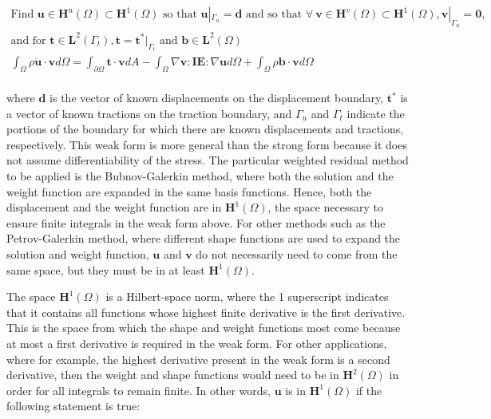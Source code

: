 \documentclass[10pt]{article}
\begin{document}
\begin{tcolorbox}
\begin{equation}
\label{eq:WeakFormQ1}
\begin{aligned}
\text{Find }\textbf{u}\in \textbf{H}^u(\Omega)\subset \textbf{H}^1(\Omega) \text{ so that } \textbf{u}|_{\Gamma_u}=\textbf{d} \text{ and so that }\forall\ \textbf{v} \in \textbf{H}^v(\Omega)\subset \textbf{H}^1(\Omega), \textbf{v}|_{\Gamma_u}=\textbf{0},\\
\text{and for }\textbf{t}\in\textbf{L}^2(\Gamma_t), \textbf{t}=\textbf{t}^{*}|_{\Gamma_t}\text{ and }\textbf{b}\in\textbf{L}^2(\Omega)\\
\int_{\Omega}\rho\ddot{\textbf{u}}\cdot \textbf{v}d\Omega=\int_{\partial\Omega}\textbf{t}\cdot\textbf{v}dA- \int_{\Omega}\nabla\textbf{v}:\textbf{IE}:\nabla\textbf{u}d\Omega +\int_{\Omega}\rho\textbf{b}\cdot\textbf{v}d\Omega\\
\end{aligned}
\end{equation}
\end{tcolorbox}

where \(\textbf{d}\) is the vector of known displacements on the displacement boundary, \(\textbf{t}^{*}\) is a vector of known tractions on the traction boundary, and \(\Gamma_u\)  and \(\Gamma_t\) indicate the portions of the boundary for which there are known displacements and tractions, respectively. This weak form is more general than the strong form because it does not assume differentiability of the stress. The particular weighted residual method to be applied is the Bubnov-Galerkin method, where both the solution and the weight function are expanded in the same basis functions. Hence, both the displacement and the weight function are in \(\textbf{H}^1(\Omega)\), the space necessary to ensure finite integrals in the weak form above. For other methods such as the Petrov-Galerkin method, where different shape functions are used to expand the solution and weight function, \(\textbf{u}\) and \(\textbf{v}\) do not necessarily need to come from the same space, but they must be in at least \(\textbf{H}^1(\Omega)\).

The space \(\textbf{H}^1(\Omega)\) is a Hilbert-space norm, where the 1 superscript indicates that it contains all functions whose highest finite derivative is the first derivative. This is the space from which the shape and weight functions most come because at most a first derivative is required in the weak form. For other applications, where for example, the highest derivative present in the weak form is a second derivative, then the weight and shape functions would need to be in \(\textbf{H}^2(\Omega)\) in order for all integrals to remain finite. In other words, \(\textbf{u}\) is in \(\textbf{H}^1(\Omega)\) if the following statement is true:
\end{document}
